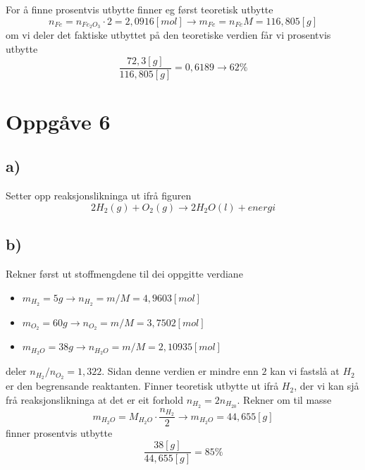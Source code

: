 \documentclass[12pt,a4paper]{article}
\begin{document}
    For å finne prosentvis utbytte finner eg først teoretisk utbytte
    \begin{equation}
      n_{Fe} = n_{Fe_2O_3} \cdot 2 = 2,0916[mol] \rightarrow m_{Fe} = n_{Fe}M = 116,805[g]
    \end{equation}
    om vi deler det faktiske utbyttet på den teoretiske verdien får vi prosentvis utbytte
    \begin{equation}
      \frac{72,3[g]}{116,805[g]} = 0,6189 \rightarrow 62\%
    \end{equation}

  \section*{Oppgåve 6}
    \subsection*{a)}
    Setter opp reaksjonslikninga ut ifrå figuren
    \begin{equation}
      2H_2(g) + O_2(g) \longrightarrow 2H_2O(l) + energi
    \end{equation}

    \subsection*{b)}
    Rekner først ut stoffmengdene til dei oppgitte verdiane
    \begin{itemize}
      \item $m_{H_2} = 5g \rightarrow n_{H_2} = m/M = 4,9603[mol]$
      \item $m_{O_2} = 60g \rightarrow n_{O_2} = m/M = 3,7502[mol]$
      \item $m_{H_2O} = 38g \rightarrow n_{H_2O} = m/M = 2,10935[mol]$
    \end{itemize}
    deler $n_{H_2} / n_{O_2} = 1,322$. Sidan denne verdien er mindre enn $2$ kan vi
    fastslå at $H_2$ er den begrensande reaktanten. Finner teoretisk utbytte
    ut ifrå $H_2$, der vi kan sjå frå reaksjonslikninga at det er eit forhold
    $n_{H_2} = 2n_{H_20}$. Rekner om til masse
    \begin{equation}
      m_{H_2O} = M_{H_2O}\cdot \frac{n_{H_2}}{2} \rightarrow m_{H_2O} = 44,655[g]
    \end{equation}
    finner prosentvis utbytte
    \begin{equation}
      \frac{38[g]}{44,655[g]} = 85\%
    \end{equation}
\end{document}
